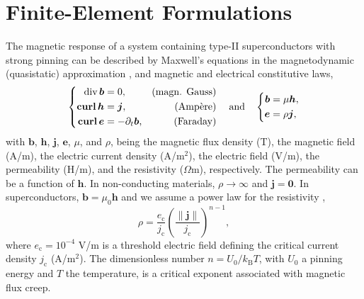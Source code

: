 \documentclass[journal]{IEEEtran}
\renewcommand{\vec}[1]{\boldsymbol{#1}} %
\newcommand{\paren}[1]{\left(#1\right)}
\renewcommand{\div}{\text{div}\, }
\newcommand{\curl}{\text{\textbf{curl}}\, }
\renewcommand{\b}{\vec b}
\newcommand{\h}{\vec h}
\newcommand{\e}{\vec e}
\renewcommand{\j}{\vec j}
\newcommand{\dt}{\partial_t}
\newcommand{\ec}{e_{\text{c}}}
\newcommand{\jc}{j_{\text{c}}}
\renewcommand{\O}{\Omega}
\begin{document}

\section{Finite-Element Formulations}\label{sec_formulations}

The magnetic response of a system containing type-II superconductors with strong pinning can be described by Maxwell's equations in the magnetodynamic (quasistatic) approximation \cite{jackson1999classical}, and magnetic and electrical constitutive laws,
\begin{equation}\label{MQSequations}
\left\{\begin{aligned}
\div\b &= 0,& \text{(magn. Gauss)}\\
\curl\h &= \j, &\text{(Ampère)}\\
\curl\e &= -\dt \b,&\text{(Faraday)}
\end{aligned}\right. \quad \text{and} \quad  \left\{\begin{aligned}
\b &= \mu \h,\\
\e &= \rho \j,
\end{aligned}\right.
\end{equation}
with $\b$, $\h$, $\j$, $\e$, $\mu$, and $\rho$, being the magnetic flux density (T), the magnetic field (A/m), the electric current density (A/m$^2$), the electric field (V/m), the permeability (H/m), and the resistivity ($\O$m), respectively. The permeability can be a function of $\h$. In non-conducting materials, $\rho \to \infty$ and $\j = \vec 0$. In superconductors, $\b = \mu_0 \h$ and we assume a power law for the resistivity \cite{rhyner1993magnetic},
\begin{equation}\label{eqn_contitutiveje}
\rho = \frac{\ec}{\jc}\paren{ \frac{\|\j\|}{\jc}}^{n-1},
\end{equation}
where $\ec = 10^{-4}$ V/m is a threshold electric field defining the critical current density $\jc$ (A/m$^2$). The dimensionless number $n=U_0/k_\text{B}T$, with $U_0$ a pinning energy and $T$ the temperature, is a critical exponent associated with magnetic flux creep.
\end{document}
